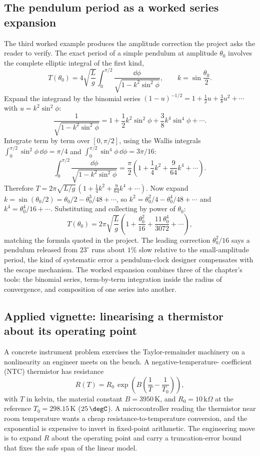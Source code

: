 \subsection{The pendulum period as a worked series expansion}

The third worked example produces the amplitude correction the project
asks the reader to verify. The exact period of a simple pendulum at
amplitude $\theta_{0}$ involves the complete elliptic integral of the
first kind,
\[
T(\theta_{0}) = 4 \sqrt{\frac{L}{g}} \int_{0}^{\pi/2}
\frac{\dd \phi}{\sqrt{1 - k^{2} \sin^{2} \phi}}, \qquad k =
\sin\frac{\theta_{0}}{2}.
\]
Expand the integrand by the binomial series $(1 - u)^{-1/2} = 1 +
\tfrac{1}{2} u + \tfrac{3}{8} u^{2} + \cdots$ with $u = k^{2} \sin^{2}
\phi$:
\[
\frac{1}{\sqrt{1 - k^{2}\sin^{2}\phi}} = 1 + \frac{1}{2} k^{2}
\sin^{2}\phi + \frac{3}{8} k^{4} \sin^{4}\phi + \cdots.
\]
Integrate term by term over $[0, \pi/2]$, using the Wallis integrals
$\int_{0}^{\pi/2} \sin^{2}\phi \, \dd\phi = \pi/4$ and
$\int_{0}^{\pi/2} \sin^{4}\phi \, \dd\phi = 3\pi/16$:
\[
\int_{0}^{\pi/2} \frac{\dd\phi}{\sqrt{1 - k^{2}\sin^{2}\phi}} =
\frac{\pi}{2}\left(1 + \frac{1}{4} k^{2} + \frac{9}{64} k^{4} +
\cdots\right).
\]
Therefore $T = 2\pi\sqrt{L/g}\,(1 + \tfrac{1}{4} k^{2} + \tfrac{9}{64}
k^{4} + \cdots)$. Now expand $k = \sin(\theta_{0}/2) = \theta_{0}/2 -
\theta_{0}^{3}/48 + \cdots$, so $k^{2} = \theta_{0}^{2}/4 -
\theta_{0}^{4}/48 + \cdots$ and $k^{4} = \theta_{0}^{4}/16 + \cdots$.
Substituting and collecting by power of $\theta_{0}$:
\[
T(\theta_{0}) = 2\pi\sqrt{\frac{L}{g}}\left(1 + \frac{\theta_{0}^{2}}{16}
+ \frac{11\,\theta_{0}^{4}}{3072} + \cdots\right),
\]
matching the formula quoted in the project. The leading correction
$\theta_{0}^{2}/16$ says a pendulum released from $23^{\circ}$ runs
about $1\%$ slow relative to the small-amplitude period, the kind of
systematic error a pendulum-clock designer compensates with the escape
mechanism. The worked expansion combines three of the chapter's tools:
the binomial series, term-by-term integration inside the radius of
convergence, and composition of one series into another.

\subsection{Applied vignette: linearising a thermistor about its operating
point}

A concrete instrument problem exercises the Taylor-remainder machinery
on a nonlinearity an engineer meets on the bench. A negative-temperature-
coefficient (NTC) thermistor has resistance
\[
R(T) = R_{0}\,\exp\!\left(B\left(\frac{1}{T} - \frac{1}{T_{0}}\right)
\right),
\]
with $T$ in kelvin, the material constant $B = 3950\,\text{K}$, and
$R_{0} = 10\,\text{k}\Omega$ at the reference $T_{0} = 298.15\,\text{K}$
($25\,\degC$). A microcontroller reading the thermistor near room
temperature wants a cheap resistance-to-temperature conversion, and the
exponential is expensive to invert in fixed-point arithmetic. The
engineering move is to expand $R$ about the operating point and carry a
truncation-error bound that fixes the safe span of the linear model.

